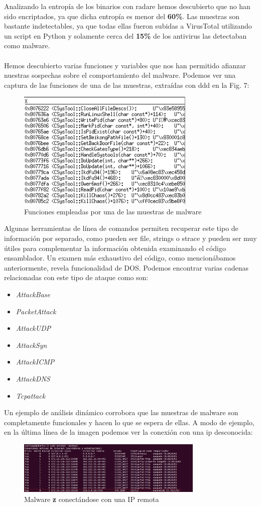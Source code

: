 \documentclass[journal]{IEEEtran}
\begin{document}
Analizando la entropía de los binarios con radare hemos descubierto que no han sido encriptados, ya que dicha entropía es menor del \textbf{60\%}. Las muestras son bastante indetectables, ya que todas ellas fueron subidas a VirusTotal utilizando un script en Python y solamente cerca del \textbf{15\%} de los antivirus las detectaban como malware.
\\\\
Hemos descubierto varias funciones y variables que nos han permitido afianzar nuestras sospechas sobre el comportamiento del malware. Podemos ver una captura de las funciones de una de las muestras, extraídas con ddd en la Fig. 7:
\begin{figure}[H]
\centerline{
\includegraphics[width=8.5cm]{img/ddd}
}
\caption{Funciones empleadas por una de las muestras de malware}
\label{fig:sesion_atacante}
\end{figure}
Algunas herramientas de línea de comandos permiten recuperar este tipo de información por separado, como pueden ser file, strings o strace y pueden ser muy útiles para complementar la información obtenida examinando el código ensamblador. Un examen más exhaustivo del código, como mencionábamos anteriormente, revela funcionalidad de DOS. Podemos encontrar varias cadenas relacionadas con este tipo de ataque como son:
\begin{itemize}
\item \textit{AttackBase}
\item \textit{PacketAttack}
\item \textit{AttackUDP}
\item \textit{AttackSyn}
\item \textit{AttackICMP}
\item \textit{AttackDNS}
\item \textit{Tcpattack}
\end{itemize}
Un ejemplo de análisis dinámico corrobora que las muestras de malware son completamente funcionales y hacen lo que se espera de ellas. A modo de ejemplo, en la última línea de la imagen podemos ver la conexión con una ip desconocida:
\begin{figure}[H]
\centerline{
\includegraphics[width=8.9cm]{img/netstat}
}
\caption{Malware \textbf{z} conectándose con una IP remota}
\label{fig:sesion_atacante}
\end{figure}
\end{document}
